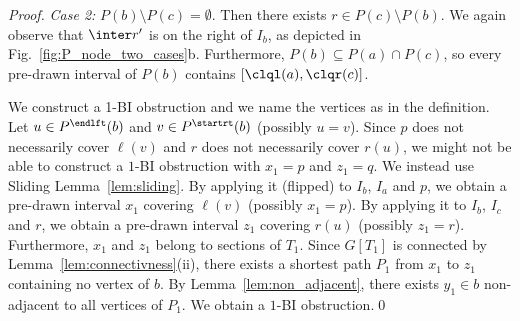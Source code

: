 \begin{proof}
\emph{Case 2:} $P(b) \setminus P(c) = \emptyset$. Then there exists $r \in P(c) \setminus P(b)$. 
We again observe that $\inter r'$ is on the right of $I_b$, as depicted in
Fig.~\ref{fig:P_node_two_cases}b. Furthermore, $P(b) \subseteq P(a) \cap P(c)$, so every
pre-drawn interval of $P(b)$ contains $[\clql(a),\clqr(c)]$.

We construct a 1-BI obstruction and we name the vertices as in the definition. Let $u \in
P^\endlft(b)$ and $v \in P^\startrt(b)$ (possibly $u = v$). Since $p$ does not necessarily cover
$\ell(v)$ and $r$ does not necessarily cover $r(u)$, we might not be able to construct a $1$-BI
obstruction with $x_1=p$ and $z_1=q$. We instead use Sliding Lemma~\ref{lem:sliding}. By applying it
(flipped) to $I_b$, $I_a$ and $p$, we obtain a pre-drawn interval $x_1$ covering $\ell(v)$ (possibly
$x_1 = p$). By applying it to $I_b$, $I_c$ and $r$, we obtain a pre-drawn interval $z_1$ covering
$r(u)$ (possibly $z_1 = r$). Furthermore, $x_1$ and $z_1$ belong to sections of $T_1$. Since
$G[T_1]$ is connected by Lemma~\ref{lem:connectivness}(ii), there exists a shortest path $P_1$ from
$x_1$ to $z_1$ containing no vertex of $b$. By Lemma~\ref{lem:non_adjacent}, there exists $y_1 \in
b$ non-adjacent to all vertices of $P_1$. We obtain a $1$-BI obstruction.\qed
\end{proof}

